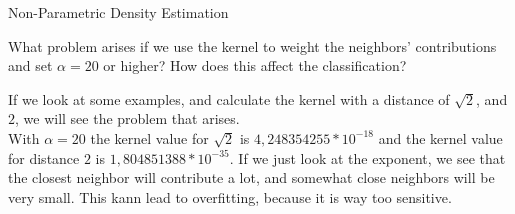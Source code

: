 \documentclass[
	english,
        solution=true
	]{tudaexercise}
\begin{document}
\begin{task}[points=9]{Non-Parametric Density Estimation}
\begin{subtask}[points=7]
\begin{solution}
\end{solution}
\end{subtask}

\begin{subtask}[points=2]
What problem arises if we use the kernel to weight the neighbors’ contributions and set $\alpha = 20$ or higher? How does this affect the classification?
\end{subtask}

\begin{solution}

If we look at some examples, and calculate the kernel with a distance of $\sqrt{2}$, and $2$, we will see the problem that arises.\\
With $\alpha=20$ the kernel value for $\sqrt{2}$ is $4,248354255*10^{-18}$ and the kernel value for distance $2$ is  $1,804851388*10^{-35}$. If we just look at the exponent, we see that the closest neighbor will contribute a lot, and somewhat close neighbors will be very small.  This kann lead to overfitting, because it is way too sensitive.

\end{solution}
\end{task}

\newpage
\end{document}
